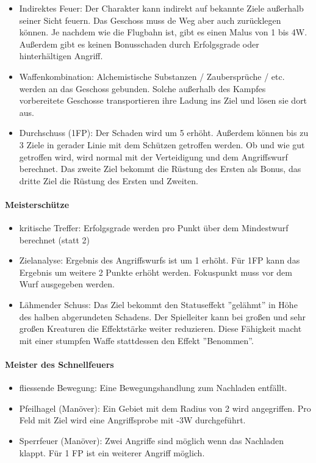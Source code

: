 \documentclass{article}
\begin{document}
\begin{itemize}
\item Indirektes Feuer: Der Charakter kann indirekt auf bekannte Ziele außerhalb seiner Sicht feuern. Das Geschoss muss de  Weg aber auch zurücklegen können. Je nachdem wie die Flugbahn ist, gibt es einen Malus von 1 bis 4W. Außerdem gibt es keinen Bonusschaden durch Erfolgsgrade oder hinterhältigen Angriff.
\item Waffenkombination: Alchemistische Substanzen / Zaubersprüche / etc. werden an das Geschoss gebunden. Solche außerhalb des Kampfes vorbereitete Geschosse transportieren ihre Ladung ins Ziel und lösen sie dort aus.
\item Durchschuss (1FP): Der Schaden wird um 5 erhöht. Außerdem können bis zu 3 Ziele in gerader Linie mit dem Schützen getroffen werden. Ob und wie gut getroffen wird, wird normal mit der Verteidigung und dem Angriffswurf berechnet. Das zweite Ziel bekommt die Rüstung des Ersten als Bonus, das dritte Ziel die Rüstung des Ersten und Zweiten.
\end{itemize}

\paragraph{Meisterschütze}

\begin{itemize}
\item kritische Treffer: Erfolgsgrade werden pro Punkt über dem Mindestwurf berechnet (statt 2)
\item Zielanalyse: Ergebnis des Angriffswurfs ist um 1 erhöht. Für 1FP kann das Ergebnis um weitere 2 Punkte erhöht werden. Fokuspunkt muss vor dem Wurf ausgegeben werden.
\item Lähmender Schuss: Das Ziel bekommt den Statuseffekt ''gelähmt'' in Höhe des halben abgerundeten Schadens. Der Spielleiter kann bei großen und sehr großen Kreaturen die Effektstärke weiter reduzieren. Diese Fähigkeit macht mit einer stumpfen Waffe stattdessen den Effekt ''Benommen''.
\end{itemize}

\paragraph{Meister des Schnellfeuers}

\begin{itemize}
\item fliessende Bewegung: Eine Bewegungshandlung zum Nachladen entfällt.
\item Pfeilhagel (Manöver): Ein Gebiet mit dem Radius von 2 wird angegriffen. Pro Feld mit Ziel wird eine Angriffsprobe mit -3W durchgeführt.
\item Sperrfeuer (Manöver): Zwei Angriffe sind möglich wenn das Nachladen klappt. Für 1 FP ist ein weiterer Angriff möglich.
\end{itemize}
\end{document}
